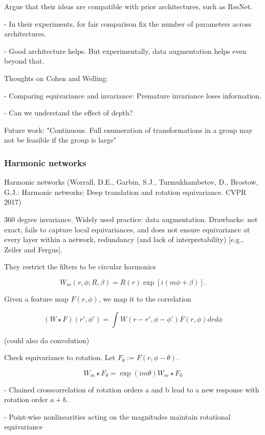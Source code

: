 \documentclass[english]{article}
\begin{document}
\item Argue that their ideas are compatible with prior architectures, such as ResNet. 


- In their experiments, for fair comparison fix the number of parameters across architectures. 

- Good architecture helps. But experimentally, data augmentation helps even beyond that.


\item Thoughts on Cohen and Welling: 

- Comparing equivariance and invariance: Premature invariance loses information. 

- Can we understand the effect of depth?

Future work: "Continuous. Full enumeration of
transformations in a group may not be feasible if the group
is large"

\eenum

\subsubsection{Harmonic networks}
\benum 

\item Harmonic networks (Worrall, D.E., Garbin, S.J., Turmukhambetov, D., Brostow, G.J.: Harmonic networks: Deep translation and rotation equivariance. CVPR 2017)

360 degree invariance. Widely used practice: data augmentation. Drawbacks: not exact, fails to capture
local equivariances, and does not ensure equivariance at every
layer within a network, redundancy (and lack of interpretability) [e.g., Zeiler and Fergus].

They restrict the filters to be circular harmonics

$$W_m(r,\phi;R,\beta)=R(r)\exp[i(m\phi+\beta)].$$

Given a feature map $F(r,\phi)$, we map it to the correlation 

$$(W \star F)(r',\phi') = \int W(r-r',\phi-\phi') F(r,\phi) drd\phi$$ 

(could also do convolution)

Check equivariance to rotation. Let $F_\theta :=F(r,\phi-\theta)$.

$$W_m \star F_\theta = \exp(im\theta) W_m \star F_0$$ 

- Chained crosscorrelation of rotation orders a and b lead to a new response
with rotation order $a + b$. 

- Point-wise nonlinearities acting on the magnitudes maintain rotational
equivariance
\end{document}
